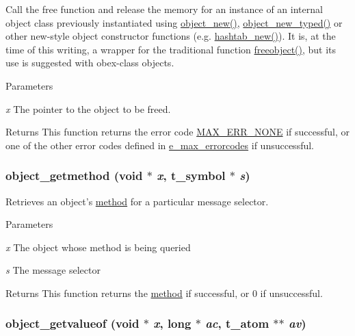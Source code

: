 Call the free function and release the memory for an instance of an internal object class previously instantiated using \hyperlink{group__obj_gac4b370265c776db4f545d257089af1cf}{object\_\-new()}, \hyperlink{group__obj_ga459c71aca6316e345379eeb424ad56ff}{object\_\-new\_\-typed()} or other new-\/style object constructor functions (e.g. \hyperlink{group__hashtab_ga70be9bbfb9bd9383824df0832477267f}{hashtab\_\-new()}). It is, at the time of this writing, a wrapper for the traditional function \hyperlink{group__class__old_gadf30646e52376a37b93cc20efac65636}{freeobject()}, but its use is suggested with obex-\/class objects.


\begin{DoxyParams}{Parameters}
\item[{\em x}]The pointer to the object to be freed. \end{DoxyParams}
\begin{DoxyReturn}{Returns}
This function returns the error code \hyperlink{group__misc_gga0764dd6c02b76cca7d053ae50555d69da6d22f77fef8b1e1b074cef5d29d935fd}{MAX\_\-ERR\_\-NONE} if successful, or one of the other error codes defined in \hyperlink{group__misc_ga0764dd6c02b76cca7d053ae50555d69d}{e\_\-max\_\-errorcodes} if unsuccessful. 
\end{DoxyReturn}
\hypertarget{group__obj_gaaa202dcda859bb5dcd1f186f88a43796}{
\subsubsection[{object\_\-getmethod}]{ object\_\-getmethod (void $\ast$ {\em x}, \/  {\bf t\_\-symbol} $\ast$ {\em s})}}
\label{group__obj_gaaa202dcda859bb5dcd1f186f88a43796}


Retrieves an object's \hyperlink{group__datatypes_gac26ba0a173b50597f5738132e059b42d}{method} for a particular message selector. 
\begin{DoxyParams}{Parameters}
\item[{\em x}]The object whose method is being queried \item[{\em s}]The message selector \end{DoxyParams}
\begin{DoxyReturn}{Returns}
This function returns the \hyperlink{group__datatypes_gac26ba0a173b50597f5738132e059b42d}{method} if successful, or 0 if unsuccessful. 
\end{DoxyReturn}
\hypertarget{group__obj_gab033973cea2f4a0b17bb48ab2f22f051}{
\subsubsection[{object\_\-getvalueof}]{ object\_\-getvalueof (void $\ast$ {\em x}, \/  long $\ast$ {\em ac}, \/  {\bf t\_\-atom} $\ast$$\ast$ {\em av})}}
\label{group__obj_gab033973cea2f4a0b17bb48ab2f22f051}


